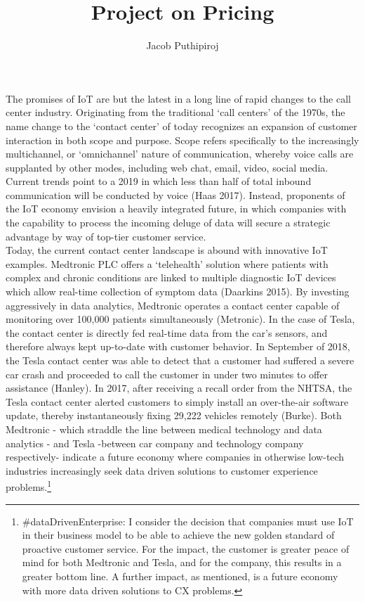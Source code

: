 \documentclass[11pt]{article}
\begin{document}
\title{Project on Pricing}
\author{Jacob Puthipiroj}
\maketitle

The promises of IoT are but the latest in a long line of rapid changes to the call center industry.  Originating from the traditional `call centers' of the 1970s, the name change to the `contact center' of today recognizes an expansion of customer interaction in both scope and purpose. Scope refers specifically to the increasingly multichannel, or `omnichannel' nature of communication, whereby voice calls are supplanted by other modes, including web chat, email, video, social media. Current trends point to a 2019 in which less than half of total inbound communication will be conducted by voice (Haas 2017). Instead, proponents of the IoT economy envision a heavily integrated future, in which companies with the capability to process the incoming deluge of data will secure a strategic advantage by way of top-tier customer service.\\

Today, the current contact center landscape is abound with innovative IoT examples. Medtronic PLC offers a `telehealth' solution where patients with complex and chronic conditions are linked to multiple diagnostic IoT devices which allow real-time collection of symptom data (Daarkins 2015). By investing aggressively in data analytics, Medtronic operates a contact center capable of monitoring over 100,000 patients simultaneously (Metronic). In the case of Tesla, the contact center is directly fed real-time data from the car's sensors, and therefore always kept up-to-date with customer behavior. In September of 2018, the Tesla contact center was able to detect that a customer had suffered a severe car crash and proceeded to call the customer in under two minutes to offer assistance (Hanley). In 2017, after receiving a recall order from the NHTSA, the Tesla contact center alerted customers to simply install an over-the-air software update, thereby instantaneously fixing 29,222 vehicles remotely (Burke). Both Medtronic - which straddle the line between medical technology and data analytics - and Tesla -between car company and technology company respectively-  indicate a future economy where companies in otherwise low-tech industries increasingly seek data driven solutions to customer experience problems.\footnote{\#dataDrivenEnterprise:  I consider the decision that companies must use IoT in their business model to be able to achieve the new golden standard of proactive customer service. For the impact, the customer is greater peace of mind for both Medtronic and Tesla, and for the company, this results in a greater bottom line. A further impact, as mentioned, is a future economy with more data driven solutions to CX problems.}\\
\end{document}

